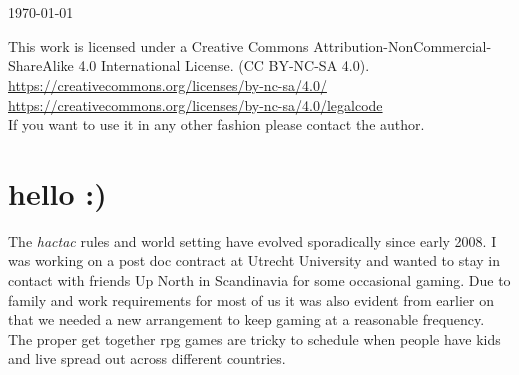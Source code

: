 \documentclass[11pt, twoside, titlepage, a4paper]{report}
\renewcommand{\chaptermark}[1]{\markboth{#1}{}}
\begin{document}
\begin{titlepage}
\begin{center}
   \vfill %


   \ %



   \ %

   \normalsize{\today}

\end{center}


\end{titlepage}




\raggedbottom

\noindent This work is licensed under a Creative Commons Attribution-NonCommercial-ShareAlike 4.0 International License. (CC BY-NC-SA 4.0).\\
\url{https://creativecommons.org/licenses/by-nc-sa/4.0/} \\
\url{https://creativecommons.org/licenses/by-nc-sa/4.0/legalcode} \\
If you want to use it in any other fashion please contact the author.






\cleardoublepage %
\raggedbottom

\chaptermark{hello}
\chapter*{hello :)}

The \emph{hactac} rules and world setting have evolved sporadically since early 2008. I was working on a post doc contract at Utrecht University and wanted to stay in contact with friends Up North in Scandinavia for some occasional gaming. Due to family and work requirements for most of us it was also evident from earlier on that we needed a new arrangement to keep gaming at a reasonable frequency. The proper get together rpg games are tricky to schedule when people have kids and live spread out across different countries.
\end{document}
